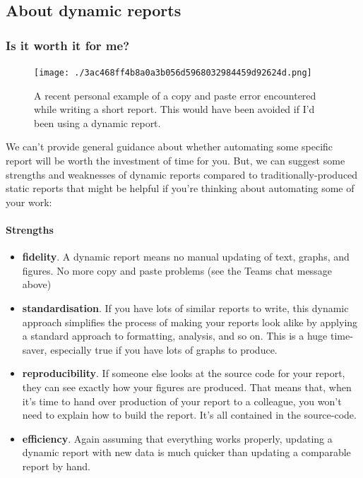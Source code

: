 \documentclass[
]{article}
\providecommand{\tightlist}{%
  \setlength{\itemsep}{0pt}\setlength{\parskip}{0pt}}
\begin{document}
\hypertarget{about-dynamic-reports}{%
\subsection{About dynamic reports}\label{about-dynamic-reports}}

\hypertarget{is-it-worth-it-for-me}{%
\subsubsection{Is it worth it for me?}\label{is-it-worth-it-for-me}}

\begin{figure}
\centering
\texttt{[image: ./3ac468ff4b8a0a3b056d5968032984459d92624d.png]}
\caption{A recent personal example of a copy and paste error encountered
while writing a short report. This would have been avoided if I'd been
using a dynamic report.}
\end{figure}

We can't provide general guidance about whether automating some specific
report will be worth the investment of time for you. But, we can suggest
some strengths and weaknesses of dynamic reports compared to
traditionally-produced static reports that might be helpful if you're
thinking about automating some of your work:

\hypertarget{strengths}{%
\paragraph{Strengths}\label{strengths}}

\begin{itemize}
\tightlist
\item
  \textbf{fidelity}. A dynamic report means no manual updating of text,
  graphs, and figures. No more copy and paste problems (see the Teams
  chat message above)
\item
  \textbf{standardisation}. If you have lots of similar reports to
  write, this dynamic approach simplifies the process of making your
  reports look alike by applying a standard approach to formatting,
  analysis, and so on. This is a huge time-saver, especially true if you
  have lots of graphs to produce.
\item
  \textbf{reproducibility}. If someone else looks at the source code for
  your report, they can see exactly how your figures are produced. That
  means that, when it's time to hand over production of your report to a
  colleague, you won't need to explain how to build the report. It's all
  contained in the source-code.
\item
  \textbf{efficiency}. Again assuming that everything works properly,
  updating a dynamic report with new data is much quicker than updating
  a comparable report by hand.
\end{itemize}
\end{document}
